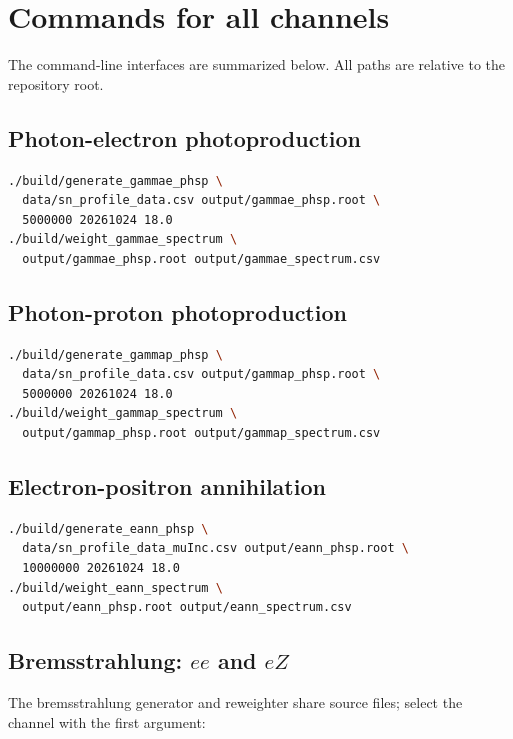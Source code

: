 \documentclass[11pt,a4paper]{article}
\begin{document}
\section{Commands for all channels}

The command-line interfaces are summarized below. All paths are relative to the repository root.

\subsection{Photon-electron photoproduction}

\begin{lstlisting}[language=bash]
./build/generate_gammae_phsp \
  data/sn_profile_data.csv output/gammae_phsp.root \
  5000000 20261024 18.0
./build/weight_gammae_spectrum \
  output/gammae_phsp.root output/gammae_spectrum.csv
\end{lstlisting}

\subsection{Photon-proton photoproduction}

\begin{lstlisting}[language=bash]
./build/generate_gammap_phsp \
  data/sn_profile_data.csv output/gammap_phsp.root \
  5000000 20261024 18.0
./build/weight_gammap_spectrum \
  output/gammap_phsp.root output/gammap_spectrum.csv
\end{lstlisting}

\subsection{Electron-positron annihilation}

\begin{lstlisting}[language=bash]
./build/generate_eann_phsp \
  data/sn_profile_data_muInc.csv output/eann_phsp.root \
  10000000 20261024 18.0
./build/weight_eann_spectrum \
  output/eann_phsp.root output/eann_spectrum.csv
\end{lstlisting}

\subsection{Bremsstrahlung: \texorpdfstring{$ee$ and $eZ$}{ee and eZ}}

The bremsstrahlung generator and reweighter share source files; select the channel with the first argument:
\end{document}
